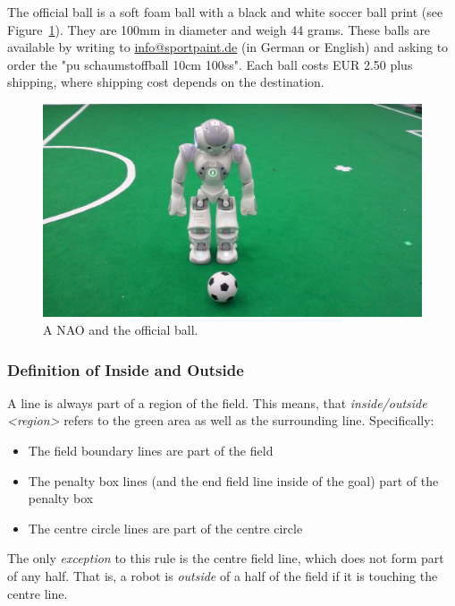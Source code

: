 The official ball is a soft foam ball with a black and white soccer ball print (see Figure~\ref{fig:ball}). They are 100mm in diameter and weigh 44 grams. These balls are available by writing to \url{info@sportpaint.de} (in German or English) and asking to order the "pu schaumstoffball 10cm 100ss".  Each ball costs EUR 2.50 plus shipping, where shipping cost depends on the destination.

\begin{figure}[t]
	\centerline{\includegraphics[height=0.28\columnwidth]{figs/robotWithBall2016.jpg}}
	\caption{A NAO and the official ball.}
	\label{fig:ball}
\end{figure}


\subsubsection{Definition of Inside and Outside}
\label{sec:inside_outside}

A line is always part of a region of the field.
This means, that \emph{inside/outside \textless region\textgreater} refers to the green area as well as the surrounding line.
Specifically:
\begin{itemize}
	\item The field boundary lines are part of the field
	\item The penalty box lines (and the end field line inside of the goal) part of the penalty box
	\item The centre circle lines are part of the centre circle
\end{itemize}

The only \textit{exception} to this rule is the centre field line, which does not form part of any half.
That is, a robot is \textit{outside} of a half of the field if it is touching the centre line.

